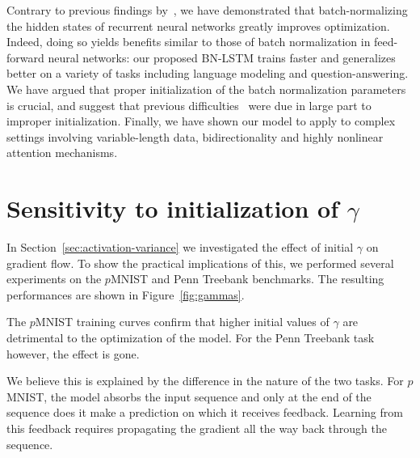 \documentclass{article} %
\begin{document}
Contrary to previous findings by~\citet{cesar,baidu}, we have demonstrated that
batch-normalizing the hidden states of recurrent neural networks greatly
improves optimization.  Indeed, doing so yields benefits similar to those of
batch normalization in feed-forward neural networks: our proposed BN-LSTM
trains faster and generalizes better on a variety of tasks including language
modeling and question-answering.  We have argued that proper initialization of
the batch normalization parameters is crucial, and suggest that previous
difficulties~\citep{cesar, baidu} were due in large part to improper
initialization.  Finally, we have shown our model to apply to complex settings
involving variable-length data, bidirectionality and highly nonlinear attention
mechanisms.






\appendix

\section{Sensitivity to initialization of $\gamma$}

In Section~\ref{sec:activation-variance} we investigated the effect of initial $\gamma$ on gradient flow.
To show the practical implications of this, we performed several experiments on the $p$MNIST and Penn Treebank benchmarks.
The resulting performances are shown in Figure~\ref{fig:gammas}.

The $p$MNIST training curves confirm that higher initial values of $\gamma$ are detrimental to the optimization of the model.
For the Penn Treebank task however, the effect is gone.

We believe this is explained by the difference in the nature of the two tasks.
For $p$MNIST, the model absorbs the input sequence and only at the end of the sequence does it make a prediction on which it receives feedback.
Learning from this feedback requires propagating the gradient all the way back through the sequence.
\end{document}
